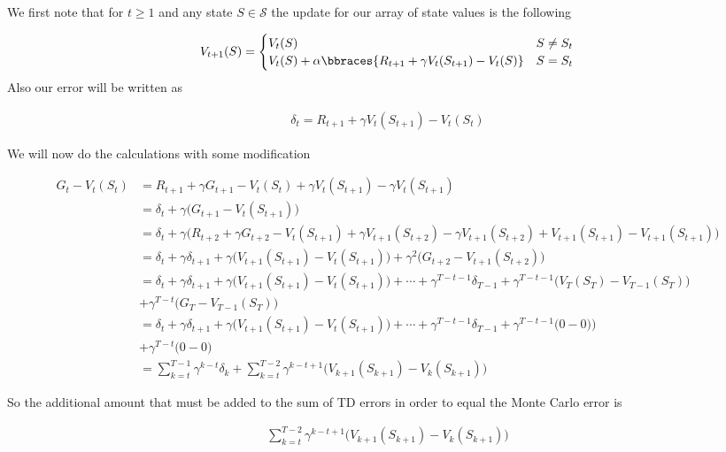 \begin{solution}

We first note that for $t \geq 1$ and any state $S \in \mathcal S$ the update for our array of state values is the following

\begin{align*}
  V_{t+1}(S)
  =
  \begin{cases}
    V_t(S) & S \neq S_t \\
    V_t(S) + \alpha \bbraces{R_{t+1} + \gamma V_t(S_{t+1}) - V_t(S)} & S = S_t
  \end{cases}
\end{align*}
Also our error will be written as

\begin{align*}
  \delta_t
  =
  R_{t+1} + \gamma V_t(S_{t+1}) - V_t(S_t)
\end{align*}

We will now do the calculations with some modification

\begin{align*}
  G_t - V_t(S_t)
  &=
  R_{t+1} + \gamma G_{t+1} - V_t(S_t) + \gamma V_t(S_{t+1}) - \gamma V_t(S_{t+1})\\
  &=
  \delta_t + \gamma \big(G_{t+1} - V_t(S_{t+1})\big) \\
  &=
  \delta_t + \gamma \big(R_{t+2} + \gamma G_{t+2} - V_t(S_{t+1}) +\gamma V_{t+1}(S_{t+2}) - \gamma V_{t+1}(S_{t+2}) + V_{t+1}(S_{t+1}) - V_{t+1}(S_{t+1})\big) \\
  &=
  \delta_t + \gamma \delta_{t+1} + \gamma\big(V_{t+1}(S_{t+1}) - V_t(S_{t+1})\big) + \gamma^2\big(G_{t+2} - V_{t+1}(S_{t+2})\big) \\
  &=
  \delta_t + \gamma \delta_{t+1} + \gamma \big(V_{t+1}(S_{t+1}) - V_t(S_{t+1})\big) + \cdots + \gamma^{T-t-1}\delta_{T-1} + \gamma^{T-t-1} \big(V_{T}(S_{T}) - V_{T-1}(S_{T})\big) \\
  &+ \gamma^{T-t}\big(G_T - V_{T-1}(S_T)\big) \\
  &=\delta_t + \gamma \delta_{t+1} + \gamma \big(V_{t+1}(S_{t+1}) - V_t(S_{t+1})\big) + \cdots + \gamma^{T-t-1}\delta_{T-1} + \gamma^{T-t-1} \big(0 - 0)\big) \\
  &+ \gamma^{T-t}\big(0-0\big) \\
  &=
  \sum_{k=t}^{T-1}\gamma^{k-t}\delta_k +
  \sum_{k=t}^{T-2}\gamma^{k-t+1}
  \big(V_{k+1}(S_{k+1}) - V_k(S_{k+1})\big)
\end{align*}

So the additional amount that must be added to the sum of TD errors in order to equal the Monte Carlo error is

\begin{align*}
\sum_{k=t}^{T-2}\gamma^{k-t+1}
\big(V_{k+1}(S_{k+1}) - V_k(S_{k+1})\big)
\end{align*}
\end{solution}

